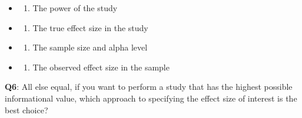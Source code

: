 \documentclass[
  letterpaper,
  DIV=11,
  numbers=noendperiod]{scrreprt}
\providecommand{\tightlist}{%
  \setlength{\itemsep}{0pt}\setlength{\parskip}{0pt}}\usepackage{longtable,booktabs,array}
\begin{document}
\begin{itemize}
\item
  \begin{enumerate}
  \def\labelenumi{(\Alph{enumi})}
  \tightlist
  \item
    The power of the study\\
  \end{enumerate}
\item
  \begin{enumerate}
  \def\labelenumi{(\Alph{enumi})}
  \setcounter{enumi}{1}
  \tightlist
  \item
    The true effect size in the study\\
  \end{enumerate}
\item
  \begin{enumerate}
  \def\labelenumi{(\Alph{enumi})}
  \setcounter{enumi}{2}
  \tightlist
  \item
    The sample size and alpha level\\
  \end{enumerate}
\item
  \begin{enumerate}
  \def\labelenumi{(\Alph{enumi})}
  \setcounter{enumi}{3}
  \tightlist
  \item
    The observed effect size in the sample\\
  \end{enumerate}
\end{itemize}

\textbf{Q6}: All else equal, if you want to perform a study that has the
highest possible informational value, which approach to specifying the
effect size of interest is the best choice?
\end{document}
